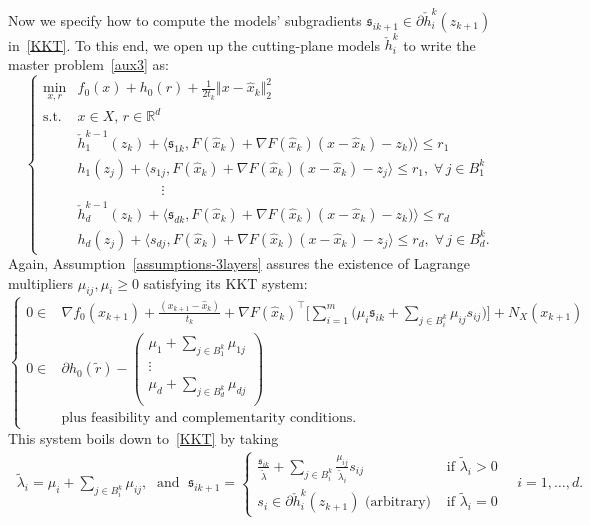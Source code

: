 \documentclass[smallextended,envcountsect]{svjour3}
\newcommand{\norm}[1]{\textstyle{\Vert} #1 \textstyle{\Vert}_2}
\newcommand{\inner}[2]{\langle#1,#2\rangle}
\renewcommand{\Re}{\mathbb{R}}
\begin{document}
Now we specify how to compute the models' subgradients  $\mathfrak{s}_{ik+1} \in \partial \check{h}_i^k(z_{k+1})$ in~\eqref{KKT}. To this end, we open up the cutting-plane models $\check{h}^k_i$ to write the master problem~\eqref{aux3} as:
\[
\left\{
\begin{array}{llll}
 \displaystyle \min_{x,r} &  \displaystyle f_0(x)+ h_0(r) + \frac{1}{2t_k}\norm{x-\hat x_k}^2\\
 \mbox{s.t.} &  x \in X, \,r\in \Re^d\\
  & \check h_1^{k-1}(z_k)+\inner{\mathfrak{s}_{1k}}{F(\hat x_k)+\nabla F(\hat x_k)(x-\hat x_k)- z_k)}\leq r_1\\
 & h_1(z_j)+\inner{s_{1j}}{F(\hat x_k)+\nabla F(\hat x_k)(x-\hat x_k)-z_{j}}\leq r_1,\; \forall\,j \in B_1^k\\
%
 & \qquad\qquad\qquad\vdots\\
  & \check h_d^{k-1}(z_k)+\inner{\mathfrak{s}_{dk}}{F(\hat x_k)+\nabla F(\hat x_k)(x-\hat x_k)- z_k)}\leq r_d\\
  & h_d(z_j)+\inner{s_{dj}}{F(\hat x_k)+\nabla F(\hat x_k)(x-\hat x_k)-z_{j}}\leq r_d,\; \forall\,j \in B_d^k.
\end{array}
\right.
\]
Again, Assumption~\ref{assumptions-3layers} assures the existence of Lagrange multipliers $\mu_{ij}, \mu_i\geq 0$ satisfying its KKT system:
\[
\left\{
\begin{array}{llll}
0 \in & \displaystyle \nabla f_0(x_{k+1})+ \frac{(x_{k+1}-\hat x_k)}{t_k} + \nabla F(\hat x_k)^\top\Big[\sum_{i=1}^m \Big(\mu_i\mathfrak{s}_{ik}+\sum_{j \in B_i^k} \mu_{ij}s_{ij}\Big)\Big]+ N_X(x_{k+1})\\
0 \in & \partial h_0(\tilde r)-\begin{pmatrix}
\displaystyle  \mu_1+\sum_{j \in B_1^k} \mu_{1j}\\
\vdots\\
\displaystyle   \mu_d+ \sum_{j \in B_d^k} \mu_{dj}\\
\end{pmatrix}\\
& \mbox{plus feasibility and complementarity conditions.}
\end{array}
\right.
\]
This system boils down to~\eqref{KKT} by taking
\begin{align}\label{aux2}
\
\tilde \lambda_i = \mu_i + \sum_{j \in B_i^k} \mu_{ij},\; \mbox{ and }\; \mathfrak{ s}_{ik+1}= \left\{  \begin{array}{lll}
\frac{\mathfrak{s}_{ik}}{\tilde \lambda} +\sum_{j \in B_i^k} \frac{\mu_{ij}}{\tilde\lambda_i}s_{ij} & \mbox{ if $\tilde\lambda_i>0$}\\
s_i \in \partial \check{h}_i^k(z_{k+1}) \mbox{ (arbitrary)} & \mbox{ if $\tilde \lambda_i=0$}
\end{array}
\right. \quad i=1,\ldots,d.
\end{align}
\end{document}
